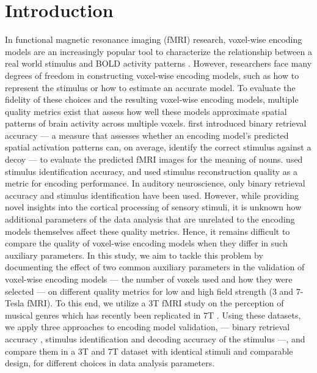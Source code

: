 \clearpage


\section*{Introduction}

In functional magnetic resonance imaging (f{MRI}) research, voxel-wise encoding models are an increasingly popular tool to characterize the relationship between a real world stimulus and BOLD activity patterns \citep{TD+06,KG+08,NG11,huth2012continuous,holdgraf2016rapid}. However, researchers face many degrees of freedom in constructing voxel-wise encoding models, such as how to represent the stimulus or how to estimate an accurate model. To evaluate the fidelity of these choices and the resulting voxel-wise encoding models, multiple quality metrics exist that assess how well these models approximate spatial patterns of brain activity across multiple voxels. \citet{ML08} first introduced binary retrieval accuracy --- a measure that assesses whether an encoding model's predicted spatial activation patterns can, on average, identify the correct stimulus against a decoy --- to evaluate the predicted f{MRI} images for the meaning of nouns. \citet{KG+08} used stimulus identification accuracy, and \citet{NG09} used stimulus reconstruction quality as a metric for encoding performance. In auditory neuroscience, only binary retrieval accuracy \citep{CTK+2012,hoefle2018identifying} and stimulus identification \citep{SF14,allen2018encoding} have been used.
However, while providing novel insights into the cortical processing of sensory stimuli, it is unknown how additional parameters of the data analysis that are unrelated to the encoding models themselves affect these quality metrics. Hence, it remains difficult to compare the quality of voxel-wise encoding models when they differ in such auxiliary parameters.
In this study, we aim to tackle this problem by documenting the effect of two common auxiliary parameters in the validation of voxel-wise encoding models --- the number of voxels used and how they were selected --- on different quality metrics for low and high field strength (3 and 7-Tesla f{MRI}). To this end, we utilize a 3T f{MRI} study on the perception of musical genres \citep{CTK+2012} which has recently been replicated in 7T \citep{HDH+2015}. Using these datasets, we apply three approaches to encoding model validation, --- binary retrieval accuracy \citep{ML08}, stimulus identification \citep{KG+08,SF14} and decoding accuracy of the stimulus \citep{NG09} ---, and compare them in a 3T and 7T dataset with identical stimuli and comparable design, for different choices in data analysis parameters.


